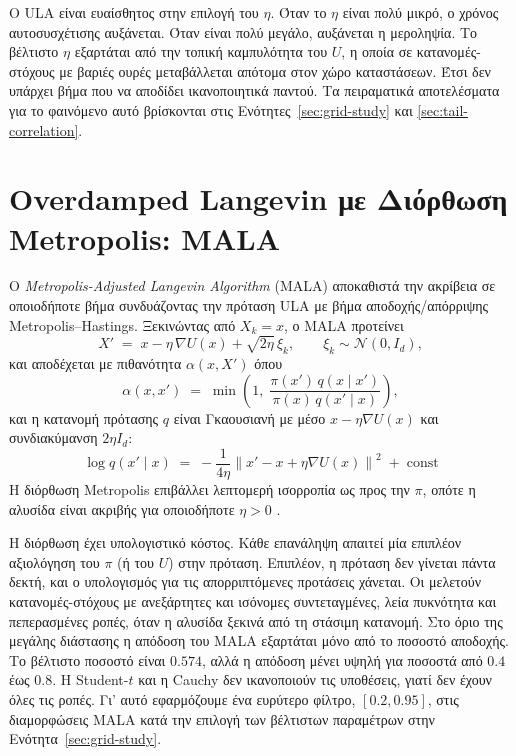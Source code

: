 Ο ULA είναι ευαίσθητος στην επιλογή του $\eta$. Όταν το $\eta$ είναι πολύ μικρό,
ο χρόνος αυτοσυσχέτισης αυξάνεται. Όταν είναι πολύ μεγάλο,
αυξάνεται η μεροληψία. Το βέλτιστο $\eta$ εξαρτάται από
την τοπική καμπυλότητα του $U$, η οποία σε κατανομές-στόχους με βαριές ουρές
μεταβάλλεται απότομα στον χώρο καταστάσεων. Έτσι δεν υπάρχει βήμα που να αποδίδει
ικανοποιητικά παντού. Τα πειραματικά αποτελέσματα για το φαινόμενο αυτό βρίσκονται στις
Ενότητες~\ref{sec:grid-study} και \ref{sec:tail-correlation}.

\section{Overdamped Langevin με Διόρθωση Metropolis: MALA}
\label{sec:alg-mala}

Ο \emph{Metropolis-Adjusted Langevin Algorithm} (MALA) αποκαθιστά την ακρίβεια
σε οποιοδήποτε βήμα συνδυάζοντας την πρόταση ULA με βήμα αποδοχής/απόρριψης
Metropolis--Hastings. Ξεκινώντας από $X_k = x$, ο MALA προτείνει
\begin{equation}
  X' \;=\; x - \eta\, \nabla U(x) + \sqrt{2\eta}\, \xi_k,
  \qquad \xi_k \sim \mathcal{N}(0, I_d),
\end{equation}
και αποδέχεται με πιθανότητα $\alpha(x, X')$ όπου
\begin{equation}
  \alpha(x, x') \;=\; \min\!\left(1, \;
    \frac{\pi(x')\, q(x \mid x')}{\pi(x)\, q(x' \mid x)}
  \right),
  \label{eq:mh-prob}
\end{equation}
και η κατανομή πρότασης $q$ είναι Γκαουσιανή με μέσο $x - \eta\nabla U(x)$
και συνδιακύμανση $2\eta I_d$:
\begin{equation}
  \log q(x' \mid x) \;=\; -\frac{1}{4\eta} \left\| x' - x + \eta \nabla U(x) \right\|^2
    \;+\; \text{const}
  \label{eq:mala-proposal}
\end{equation}
Η διόρθωση Metropolis επιβάλλει λεπτομερή ισορροπία ως προς την $\pi$, οπότε
η αλυσίδα είναι ακριβής για οποιοδήποτε $\eta > 0$
\citep{roberts1998optimal, robert2004monte}.

Η διόρθωση έχει υπολογιστικό κόστος. Κάθε επανάληψη απαιτεί μία επιπλέον
αξιολόγηση του $\pi$ (ή του $U$) στην πρόταση. Επιπλέον, η πρόταση δεν γίνεται
πάντα δεκτή, και ο υπολογισμός για τις απορριπτόμενες προτάσεις χάνεται.
Οι \citet{roberts1998optimal} μελετούν κατανομές-στόχους με ανεξάρτητες και ισόνομες
συντεταγμένες, λεία πυκνότητα και πεπερασμένες ροπές, όταν η αλυσίδα ξεκινά από τη
στάσιμη κατανομή. Στο όριο της μεγάλης διάστασης η απόδοση του MALA εξαρτάται μόνο
από το ποσοστό αποδοχής. Το βέλτιστο ποσοστό είναι $0.574$, αλλά η απόδοση μένει
υψηλή για ποσοστά από $0.4$ έως $0.8$. Η Student-$t$ και η Cauchy δεν ικανοποιούν τις
υποθέσεις, γιατί δεν έχουν όλες τις ροπές. Γι' αυτό εφαρμόζουμε ένα ευρύτερο φίλτρο,
$[0.2, 0.95]$, στις διαμορφώσεις MALA κατά την επιλογή των βέλτιστων παραμέτρων στην
Ενότητα~\ref{sec:grid-study}.

